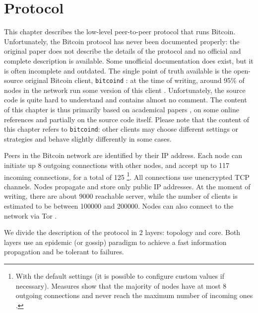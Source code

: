 \chapter{Protocol}
\label{chapter:protocol}
This chapter describes the low-level peer-to-peer protocol that runs Bitcoin.
Unfortunately, the Bitcoin protocol has never been documented properly:
the original paper \cite{bitcoin_2009} does not describe the details of the protocol and no official and complete description is available.
Some unofficial documentation does exist, but it is often incomplete and outdated.
The single point of truth available is the open-source original Bitcoin client, \texttt{bitcoind} \cite{bitcoin_github}:
at the time of writing, around \num{95}\% of nodes in the network run some version of this client \cite{bitnodes}.
Unfortunately, the source code is quite hard to understand and contains almost no comment.
The content of this chapter is thus primarily based on academical papers \cite{eclipse_attack_2015, deanonymization_2014}, on some online references \cite{bitcoin_reference, bitcoin_guide} and partially on the source code itself.
Please note that the content of this chapter refers to \texttt{bitcoind}:
other clients may choose different settings or strategies and behave slightly differently in some cases.

\medskip
Peers in the Bitcoin network are identified by their IP address.
Each node can initiate up \num{8} outgoing connections with other nodes, and accept up to \num{117} incoming connections, for a total of \num{125} \footnote{With the default settings (it is possible to configure custom values if necessary). Measures show that the majority of nodes have at most \num{8} outgoing connections and never reach the maximum number of incoming ones \cite{discovering_influential_nodes_2014}.}.
All connections use unencrypted TCP channels.
Nodes propagate and store only public IP addresses.
At the moment of writing, there are about \num{9000} reachable server, while the number of clients is estimated to be between \num{100000} and \num{200000}.
Nodes can also connect to the network via Tor \cite{bicoin_tor}.

\medskip
We divide the description of the protocol in \num{2} layers: topology and core.
Both layers use an epidemic (or gossip) paradigm \cite{gossip_1987} to achieve a fast information propagation and be tolerant to failures.


